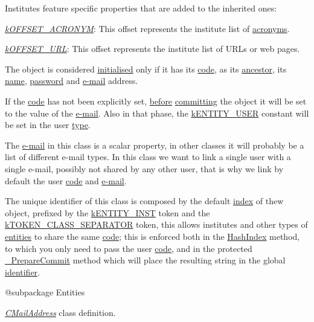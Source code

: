 Institutes feature specific properties that are added to the inherited ones\-:


\begin{DoxyItemize}
\item {\itshape \hyperlink{}{k\-O\-F\-F\-S\-E\-T\-\_\-\-A\-C\-R\-O\-N\-Y\-M}}\-: This offset represents the institute list of \hyperlink{}{acronyms}. 
\item {\itshape \hyperlink{}{k\-O\-F\-F\-S\-E\-T\-\_\-\-U\-R\-L}}\-: This offset represents the institute list of U\-R\-Ls or web pages. 
\end{DoxyItemize}

The object is considered \hyperlink{}{initialised} only if it has its \hyperlink{}{code}, as its \hyperlink{class_c_entity}{ancestor}, its \hyperlink{}{name}, \hyperlink{}{password} and \hyperlink{}{e-\/mail} address.

If the \hyperlink{}{code} has not been explicitly set, \hyperlink{}{before} \hyperlink{}{committing} the object it will be set to the value of the \hyperlink{}{e-\/mail}. Also in that phase, the \hyperlink{}{k\-E\-N\-T\-I\-T\-Y\-\_\-\-U\-S\-E\-R} constant will be set in the user \hyperlink{}{type}.

The \hyperlink{}{e-\/mail} in this class is a scalar property, in other classes it will probably be a list of different e-\/mail types. In this class we want to link a single user with a single e-\/mail, possibly not shared by any other user, that is why we link by default the user \hyperlink{}{code} and \hyperlink{}{e-\/mail}.

The unique identifier of this class is composed by the default \hyperlink{}{index} of thew object, prefixed by the \hyperlink{}{k\-E\-N\-T\-I\-T\-Y\-\_\-\-I\-N\-S\-T} token and the \hyperlink{}{k\-T\-O\-K\-E\-N\-\_\-\-C\-L\-A\-S\-S\-\_\-\-S\-E\-P\-A\-R\-A\-T\-O\-R} token, this allows institutes and other types of \hyperlink{class_c_entity}{entities} to share the same \hyperlink{}{code}; this is enforced both in the \hyperlink{}{Hash\-Index} method, to which you only need to pass the user \hyperlink{}{code}, and in the protected \hyperlink{}{\-\_\-\-Prepare\-Commit} method which will place the resulting string in the global \hyperlink{}{identifier}.

\begin{DoxyVerb}    @subpackage     Entities\end{DoxyVerb}


{\itshape \hyperlink{class_c_mail_address}{C\-Mail\-Address}} class definition.

